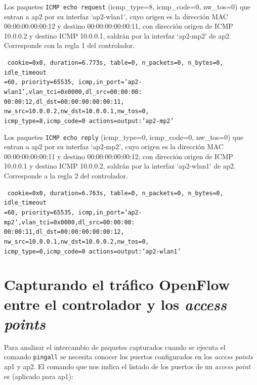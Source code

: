 \documentclass[a4paper,12pt,twoside,spanish]{book}
\begin{document}
Los paquetes \texttt{ICMP echo request} (icmp\_type=8, icmp\_code=0, nw\_tos=0) que entran a ap2 por su interfaz ‘ap2-wlan1’, cuyo origen es la dirección MAC 00:00:00:00:00:12 y destino 00:00:00:00:00:11, con dirección origen de ICMP 10.0.0.2 y destino ICMP 10.0.0.1, saldrán por la interfaz ‘ap2-mp2’ de ap2. Corresponde con la regla 1 del controlador.\par 

\noindent\texttt{
	cookie=0x0, duration=6.773s, table=0, n\_packets=0, n\_bytes=0, idle\_timeout\\
	=60, priority=65535,
	icmp,in\_port='ap2-wlan1',vlan\_tci=0x0000,dl\_src=00:00:00:\\
	00:00:12,dl\_dst=00:00:00:00:00:11,
	nw\_src=10.0.0.2,nw\_dst=10.0.0.1,nw\_tos=0,\\
	icmp\_type=8,icmp\_code=0 actions=output:'ap2-mp2'
}

Los paquetes \texttt{ICMP echo reply} (icmp\_type=0, icmp\_code=0, nw\_tos=0) que entran a ap2 por su interfaz ‘ap2-mp2’, cuyo origen es la dirección MAC 00:00:00:00:00:11 y destino 00:00:00:00:00:12, con dirección origen de ICMP 10.0.0.1 y destino ICMP 10.0.0.2, saldrán por la interfaz ‘ap2-wlan1’ de ap2. Corresponde a la regla 2 del controlador. \par 

\noindent\texttt{
	cookie=0x0, duration=6.763s, table=0, n\_packets=0, n\_bytes=0, idle\_timeout\\
	=60, priority=65535,
	icmp,in\_port='ap2-mp2',vlan\_tci=0x0000,dl\_src=00:00:00:\\
	00:00:11,dl\_dst=00:00:00:00:00:12,
	nw\_src=10.0.0.1,nw\_dst=10.0.0.2,nw\_tos=0,\\
	icmp\_type=0,icmp\_code=0 actions=output:'ap2-wlan1'
}









\section{Capturando el tráfico OpenFlow entre el controlador y los \textit{access points}}\label{sect:capt_of}

Para analizar el intercambio de paquetes capturados cuando se ejecuta el comando \texttt{pingall} se necesita conocer los puertos configurados en los \textit{access points} ap1 y ap2. El comando que nos indica el listado de los puertos de un \textit{access point} es (aplicado para ap1):\par 
\end{document}
